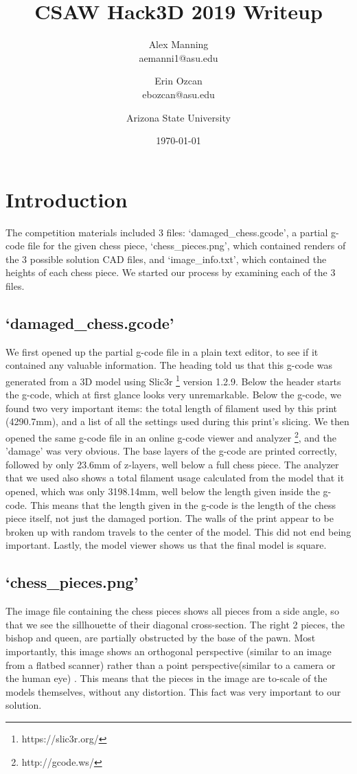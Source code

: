 \documentclass{IEEEtran}
\title{CSAW Hack3D 2019 Writeup}
\author{Alex Manning\\aemanni1@asu.edu \and Erin Ozcan \\ ebozcan@asu.edu \and Arizona State University}
\date{\today}
\begin{document}
\maketitle
    \section{Introduction}
        The competition materials included 3 files: `damaged\_chess.gcode', a partial g-code file for the given chess piece, `chess\_pieces.png', which contained renders
        of the 3 possible solution CAD files, and `image\_info.txt', which contained the heights of each chess piece.  We started our process by examining each of the 3 files.

        \subsection{`damaged\_chess.gcode'}
            We first opened up the partial g-code file in a plain text editor, to see if it contained any valuable information.  The heading told us that this g-code was generated
            from a 3D model using Slic3r \footnote{https://slic3r.org/} version 1.2.9.  Below the header starts the g-code, which at first glance looks very unremarkable.  Below the g-code, we found
            two very important items: the total length of filament used by this print (4290.7mm), and a list of all the settings used during this print's slicing.  We then opened the same g-code file
            in an online g-code viewer and analyzer \footnote{http://gcode.ws/}, and the 'damage' was very obvious.  The base layers of the g-code are printed correctly, followed by only 23.6mm of z-layers,
            well below a full chess piece.  The analyzer that we used also shows a total filament usage calculated from the model that it opened, which was only 3198.14mm, well below the length given inside
            the g-code.  This means that the length given in the g-code is the length of the chess piece itself, not just the damaged portion.  The walls of the print appear to be broken up with random travels 
            to the center of the model.  This did not end being important.  Lastly, the model viewer shows us that the final model is square.

        \subsection{`chess\_pieces.png'}
            The image file containing the chess pieces shows all pieces from a side angle, so that we see the sillhouette of their diagonal cross-section.  The right 2 pieces, the bishop and queen,
            are partially obstructed by the base of the pawn.  Most importantly, this image shows an orthogonal perspective (similar to an image from a flatbed scanner) rather than a point perspective(similar to a camera or the human eye)
            .  This means that the pieces in the image are to-scale of the models themselves, without any distortion.  This fact was very important to our solution.
\end{document}
